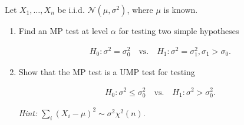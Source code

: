 
\begin{exercise}

  Let $X_1,\dots,X_n$ be i.i.d. $\mathcal{N}(\mu,\sigma^2)$, where $\mu$ is known.
  
  
  \begin{enumerate}[label = (\alph*)]
    \item Find an MP test at level $\alpha$ for testing two simple hypotheses
    
    \begin{align*}
      H_0: \sigma^2 = \sigma_0^2 \quad \text{vs.} \quad H_1: \sigma^2 = \sigma_1^2, \sigma_1 > \sigma_0.
    \end{align*}

    \item Show that the MP test is a UMP test for testing

    \begin{align*}
      H_0: \sigma^2 \leq \sigma_0^2 \quad \text{vs.} \quad H_1: \sigma^2 > \sigma_0^2.
    \end{align*}
 
    \textit{Hint:} $\sum_i (X_i - \mu)^2 \sim \sigma^2\chi^2(n)$.
  \end{enumerate}
  
  \end{exercise}
  
  
  \begin{solution}
  
  \phantom{}
  
  \end{solution}
  
  